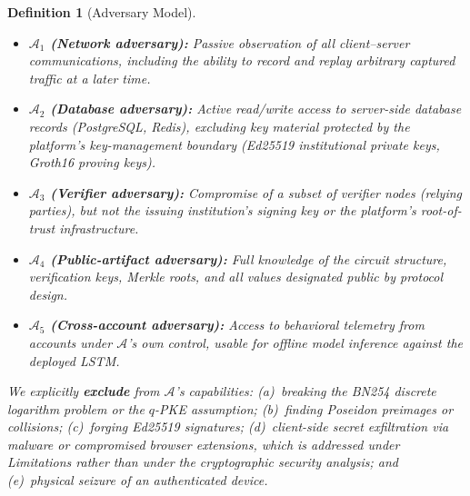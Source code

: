 \documentclass[journal,twoside,10pt]{IEEEtran}
\newtheorem{definition}{Definition}
\begin{document}
\begin{definition}[Adversary Model]
\label{def:adversaries}
\begin{itemize}
  \item \textbf{$\mathcal{A}_1$ (Network adversary):} Passive observation
        of all client--server communications, including the ability to
        record and replay arbitrary captured traffic at a later time.
  \item \textbf{$\mathcal{A}_2$ (Database adversary):} Active read/write
        access to server-side database records (PostgreSQL, Redis),
        excluding key material protected by the platform's
        key-management boundary (Ed25519 institutional private keys,
        Groth16 proving keys).
  \item \textbf{$\mathcal{A}_3$ (Verifier adversary):} Compromise of a
        subset of verifier nodes (relying parties), but not the issuing
        institution's signing key or the platform's root-of-trust
        infrastructure.
  \item \textbf{$\mathcal{A}_4$ (Public-artifact adversary):} Full
        knowledge of the circuit structure, verification keys, Merkle
        roots, and all values designated public by protocol design.
  \item \textbf{$\mathcal{A}_5$ (Cross-account adversary):} Access to
        behavioral telemetry from accounts under $\mathcal{A}$'s own
        control, usable for offline model inference against the deployed
        LSTM.
\end{itemize}
We explicitly \textbf{exclude} from $\mathcal{A}$'s capabilities:
(a)~breaking the BN254 discrete logarithm problem or the $q$-PKE
assumption; (b)~finding Poseidon preimages or collisions;
(c)~forging Ed25519 signatures; (d)~client-side secret exfiltration via
malware or compromised browser extensions, which is addressed under
Limitations rather than under the cryptographic security analysis; and
(e)~physical seizure of an authenticated device.
\end{definition}
\end{document}
